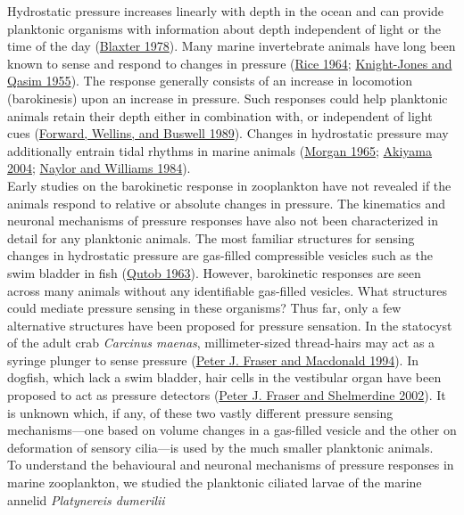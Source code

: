 \documentclass[
]{article}
\begin{document}
Hydrostatic pressure increases linearly with depth in the ocean and can
provide planktonic organisms with information about depth independent of
light or the time of the day
(\protect\hyperlink{ref-blaxter_1978}{Blaxter 1978}). Many marine
invertebrate animals have long been known to sense and respond to
changes in pressure (\protect\hyperlink{ref-rice_1964}{Rice 1964};
\protect\hyperlink{ref-knightjones_1955}{Knight-Jones and Qasim 1955}).
The response generally consists of an increase in locomotion
(barokinesis) upon an increase in pressure. Such responses could help
planktonic animals retain their depth either in combination with, or
independent of light cues
(\protect\hyperlink{ref-forward_1989c}{Forward, Wellins, and Buswell
1989}). Changes in hydrostatic pressure may additionally entrain tidal
rhythms in marine animals (\protect\hyperlink{ref-morgan1965}{Morgan
1965}; \protect\hyperlink{ref-akiyama2004}{Akiyama 2004};
\protect\hyperlink{ref-naylor1984a}{Naylor and Williams 1984}).\\
Early studies on the barokinetic response in zooplankton have not
revealed if the animals respond to relative or absolute changes in
pressure. The kinematics and neuronal mechanisms of pressure responses
have also not been characterized in detail for any planktonic animals.
The most familiar structures for sensing changes in hydrostatic pressure
are gas-filled compressible vesicles such as the swim bladder in fish
(\protect\hyperlink{ref-qutob1963}{Qutob 1963}). However, barokinetic
responses are seen across many animals without any identifiable
gas-filled vesicles. What structures could mediate pressure sensing in
these organisms? Thus far, only a few alternative structures have been
proposed for pressure sensation. In the statocyst of the adult crab
\emph{Carcinus maenas}, millimeter-sized thread-hairs may act as a
syringe plunger to sense pressure
(\protect\hyperlink{ref-fraser_1994}{Peter J. Fraser and Macdonald
1994}). In dogfish, which lack a swim bladder, hair cells in the
vestibular organ have been proposed to act as pressure detectors
(\protect\hyperlink{ref-fraser_2002}{Peter J. Fraser and Shelmerdine
2002}). It is unknown which, if any, of these two vastly different
pressure sensing mechanisms---one based on volume changes in a
gas-filled vesicle and the other on deformation of sensory cilia---is
used by the much smaller planktonic animals.\\
To understand the behavioural and neuronal mechanisms of pressure
responses in marine zooplankton, we studied the planktonic ciliated
larvae of the marine annelid \emph{Platynereis dumerilii}
\end{document}
